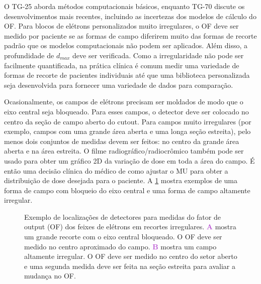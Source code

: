 \documentclass[11pt,a4paper]{article}
\newcounter{exemplo}
\begin{document}
	O TG-25 aborda métodos computacionais básicos, enquanto TG-70 discute os desenvolvimentos mais recentes, incluindo as incertezas dos modelos de cálculo do OF. Para blocos de elétrons personalizados muito irregulares, o OF deve ser medido por paciente se as formas de campo diferirem muito das formas de recorte padrão que os modelos computacionais não podem ser aplicados. Além disso, a profundidade de $d_{max}$ deve ser verificada. Como a irregularidade não pode ser facilmente quantificada, na prática clínica é comum medir uma variedade de formas de recorte de pacientes individuais até que uma biblioteca personalizada seja desenvolvida para fornecer uma variedade de dados para comparação.

	Ocasionalmente, os campos de elétrons precisam ser moldados de modo que o eixo central seja bloqueado. Para esses campos, o detector deve ser colocado no centro da seção de campo aberto do cutout. Para campos muito irregulares (por exemplo, campos com uma grande área aberta e uma longa seção estreita), pelo menos dois conjuntos de medidas devem ser feitos: no centro da grande área aberta e na área estreita. O filme radiográfico/radiocrômico também pode ser usado para obter um gráfico 2D da variação de dose em toda a área do campo. É então uma decisão clínica do médico de como ajustar o MU para obter a distribuição de dose desejada para o paciente. A \ref{fig:locaisDetectoresEletrons} mostra exemplos de uma forma de campo com bloqueio do eixo central e uma forma de campo altamente irregular.

	\begin{figure}[h]
		\centering
		\caption{Exemplo de localizações de detectores para medidas do fator de output (OF) dos feixes de elétrons em recortes irregulares. \textcolor{MediumOrchid}{\textbf{A}} mostra um grande recorte com o eixo central bloqueado. O OF deve ser medido no centro aproximado do campo. \textcolor{MediumOrchid}{\textbf{B}} mostra um campo altamente irregular. O OF deve ser medido no centro do setor aberto e uma segunda medida deve ser feita na seção estreita para avaliar a mudança no OF.}
		\label{fig:locaisDetectoresEletrons}
	\end{figure}
\end{document}
